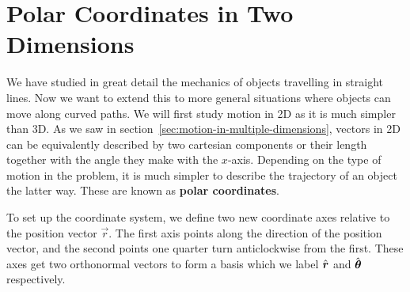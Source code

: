 \documentclass[../classical_mechanics.tex]{subfiles}
\begin{document}
    \section{Polar Coordinates in Two Dimensions}\label{sec:polar-coordinates-in-two-dimensions}
        We have studied in great detail the mechanics of objects travelling in straight lines.
        Now we want to extend this to more general situations where objects can move along curved paths.
        We will first study motion in 2D as it is much simpler than 3D.
        As we saw in section~\ref{sec:motion-in-multiple-dimensions}, vectors in 2D can be equivalently described by two cartesian components or their length together with the angle they make with the $x$-axis.
        Depending on the type of motion in the problem, it is much simpler to describe the trajectory of an object the latter way.
        These are known as \textbf{polar coordinates}.

        To set up the coordinate system, we define two new coordinate axes relative to the position vector $\vec{r}$.
        The first axis points along the direction of the position vector, and the second points one quarter turn anticlockwise from the first.
        These axes get two orthonormal vectors to form a basis which we label $\hat{\boldsymbol{r}}$ and $\hat{\boldsymbol{\theta}}$ respectively.
        \begin{figure}[H]
            \centering
        \end{figure}
\end{document}

